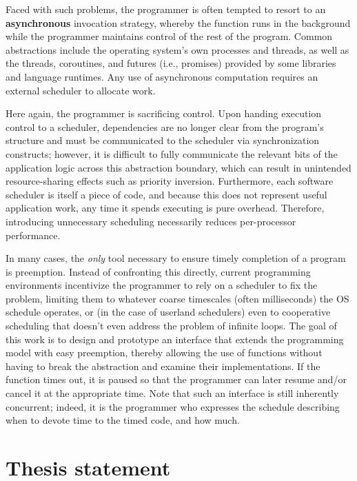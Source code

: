 \documentclass[12pt,letterpaper,openright]{report}
\begin{document}
Faced with such problems, the programmer is often tempted to resort to an
\textbf{asynchronous} invocation strategy, whereby the function runs in the
background while the programmer maintains control of the rest of the program.  Common
abstractions include the operating system's own processes and threads, as well as
the threads, coroutines, and futures (i.e., promises) provided by some libraries and
language runtimes.  Any use of asynchronous computation requires an external
scheduler to allocate work.

Here again, the programmer is sacrificing control.  Upon handing execution control to
a scheduler, dependencies are no longer clear from the program's structure and must
be communicated to the scheduler via synchronization constructs; however, it is
difficult to fully communicate the relevant bits of the application logic across this
abstraction boundary, which can result in unintended resource-sharing effects such as
priority inversion.  Furthermore, each software scheduler is itself a piece of code,
and because this does not represent useful application work, any time it spends
executing is pure overhead.  Therefore, introducing unnecessary scheduling
necessarily reduces per-processor performance.

In many cases, the \textit{only} tool necessary to ensure timely completion of a
program is preemption.  Instead of confronting this directly, current programming
environments incentivize the programmer to rely on a scheduler to fix the problem,
limiting them to whatever coarse timescales (often milliseconds) the OS schedule
operates, or (in the case of userland schedulers) even to cooperative scheduling that
doesn't even address the problem of infinite loops.  The goal of this work is to
design and prototype an interface that extends the programming model with easy
preemption, thereby allowing the use of functions without having to break the
abstraction and examine their implementations.  If the function times out, it is
paused so that the programmer can later resume and/or cancel it at the appropriate
time.  Note that such an interface is still inherently concurrent; indeed, it is the
programmer who expresses the schedule describing when to devote time to the timed
code, and how much.


\section{Thesis statement}
\end{document}
